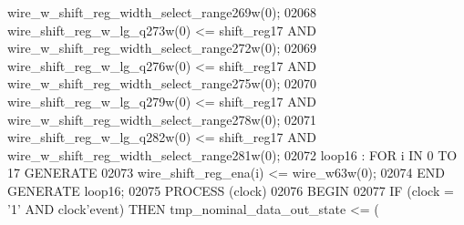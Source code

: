 \begin{DoxyCode}
{{      wire_w_shift_reg_width_select_range269w}\textcolor{vhdlchar}{(}\textcolor{vhdllogic}{}\textcolor{vhdllogic}{0}\textcolor{vhdlchar}{)};
02068     \textcolor{vhdlchar}{wire_shift_reg_w_lg_q273w}\textcolor{vhdlchar}{(}\textcolor{vhdllogic}{}\textcolor{vhdllogic}{0}\textcolor{vhdlchar}{)} \textcolor{vhdlchar}{<=} \textcolor{vhdlchar}{shift_reg17} \textcolor{keywordflow}{AND} \textcolor{vhdlchar}{
      wire_w_shift_reg_width_select_range272w}\textcolor{vhdlchar}{(}\textcolor{vhdllogic}{}\textcolor{vhdllogic}{0}\textcolor{vhdlchar}{)};
02069     \textcolor{vhdlchar}{wire_shift_reg_w_lg_q276w}\textcolor{vhdlchar}{(}\textcolor{vhdllogic}{}\textcolor{vhdllogic}{0}\textcolor{vhdlchar}{)} \textcolor{vhdlchar}{<=} \textcolor{vhdlchar}{shift_reg17} \textcolor{keywordflow}{AND} \textcolor{vhdlchar}{
      wire_w_shift_reg_width_select_range275w}\textcolor{vhdlchar}{(}\textcolor{vhdllogic}{}\textcolor{vhdllogic}{0}\textcolor{vhdlchar}{)};
02070     \textcolor{vhdlchar}{wire_shift_reg_w_lg_q279w}\textcolor{vhdlchar}{(}\textcolor{vhdllogic}{}\textcolor{vhdllogic}{0}\textcolor{vhdlchar}{)} \textcolor{vhdlchar}{<=} \textcolor{vhdlchar}{shift_reg17} \textcolor{keywordflow}{AND} \textcolor{vhdlchar}{
      wire_w_shift_reg_width_select_range278w}\textcolor{vhdlchar}{(}\textcolor{vhdllogic}{}\textcolor{vhdllogic}{0}\textcolor{vhdlchar}{)};
02071     \textcolor{vhdlchar}{wire_shift_reg_w_lg_q282w}\textcolor{vhdlchar}{(}\textcolor{vhdllogic}{}\textcolor{vhdllogic}{0}\textcolor{vhdlchar}{)} \textcolor{vhdlchar}{<=} \textcolor{vhdlchar}{shift_reg17} \textcolor{keywordflow}{AND} \textcolor{vhdlchar}{
      wire_w_shift_reg_width_select_range281w}\textcolor{vhdlchar}{(}\textcolor{vhdllogic}{}\textcolor{vhdllogic}{0}\textcolor{vhdlchar}{)};
02072     \textcolor{vhdlchar}{loop16} \textcolor{vhdlchar}{:} \textcolor{keywordflow}{FOR} \textcolor{vhdlchar}{i} \textcolor{keywordflow}{IN} \textcolor{vhdllogic}{}\textcolor{vhdllogic}{0} \textcolor{keywordflow}{TO} \textcolor{vhdllogic}{}\textcolor{vhdllogic}{17} \textcolor{keywordflow}{GENERATE}
02073         \textcolor{vhdlchar}{wire_shift_reg_ena}\textcolor{vhdlchar}{(}\textcolor{vhdlchar}{i}\textcolor{vhdlchar}{)} \textcolor{vhdlchar}{<=} \textcolor{vhdlchar}{wire_w63w}\textcolor{vhdlchar}{(}\textcolor{vhdllogic}{}\textcolor{vhdllogic}{0}\textcolor{vhdlchar}{)};
02074     \textcolor{keywordflow}{END} \textcolor{keywordflow}{GENERATE} \textcolor{vhdlchar}{loop16};
02075     \textcolor{keywordflow}{PROCESS} (clock)
02076 \textcolor{vhdlkeyword}{    BEGIN}
02077         \textcolor{keywordflow}{IF} \textcolor{vhdlchar}{(}\textcolor{vhdlchar}{clock} \textcolor{vhdlchar}{=} \textcolor{vhdlchar}{'}\textcolor{vhdllogic}{}\textcolor{vhdllogic}{1}\textcolor{vhdlchar}{'} \textcolor{keywordflow}{AND} \textcolor{vhdlchar}{clock}\textcolor{vhdlchar}{'}\textcolor{vhdlkeyword}{event}\textcolor{vhdlchar}{)} \textcolor{keywordflow}{THEN} \textcolor{vhdlchar}{tmp_nominal_data_out_state} \textcolor{vhdlchar}{<=} \textcolor{vhdlchar}{(}\textcolor{vhdlchar}{
}}
\end{DoxyCode}
